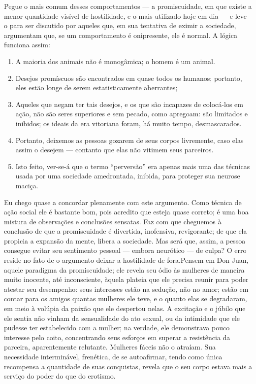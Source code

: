 Pegue o mais comum desses comportamentos --- a promiscuidade, em que
existe a menor quantidade visível de hostilidade, e o mais utilizado
hoje em dia --- e leve-o para ser discutido por aqueles que, em sua
tentativa de eximir a sociedade, argumentam que, se um comportamento é
onipresente, ele é normal. A lógica funciona assim:\idxanim{}


\begin{enumerate}
\item A maioria dos animais não é monogâmica; o homem é um animal.

\item Desejos promíscuos são encontrados em quase todos os humanos;
portanto, eles estão longe de serem estatisticamente aberrantes;

\item Aqueles que negam ter tais desejos, e os que são incapazes de
colocá-los em ação, não são seres superiores e sem pecado, como
apregoam: são limitados e inibidos; os ideais da era vitoriana foram,
há muito tempo, desmascarados.

\item Portanto, deixemos as pessoas gozarem de seus corpos livremente,
caso elas assim o desejem --- contanto que elas não vitimem seus
parceiros.

\item Isto feito, ver-se-á que o termo ``perversão'' era apenas mais uma
das técnicas usada por uma sociedade amedrontada, inibida, para
proteger sua neurose maciça.
\end{enumerate}

Eu chego quase a concordar plenamente com este argumento. Como
técnica de ação social ele é bastante bom, pois acredito que esteja
quase correto; é uma boa mistura de observações e conclusões sensatas.
Faz com que cheguemos à conclusão de que a promiscuidade\idxpromishost{} é divertida,
inofensiva, revigorante; de que ela propicia a expansão da mente,
libera a sociedade. Mas será que, assim, a pessoa consegue evitar seu
sentimento pessoal --- embora neurótico --- de culpa? O erro reside no fato
de o argumento deixar a hostilidade de fora.\idxhostsadi[|)] Pensem em Don Juan,\idxdonj{} aquele
paradigma da promiscuidade; ele revela seu ódio às mulheres de maneira
muito inocente, até inconsciente, àquela plateia que ele precisa reunir
para poder atestar seu desempenho: seus interesses estão na sedução,
não no amor; estão em contar para os amigos quantas mulheres ele teve,
e o quanto elas se degradaram, em meio à volúpia da paixão que ele
despertou nelas. A excitação e o júbilo que ele sentia não vinham da
sensualidade do ato sexual, ou da intimidade que ele pudesse ter
estabelecido com a mulher; na verdade, ele demonstrava pouco interesse
pelo coito, concentrando seus esforços em superar a resistência da
parceira, aparentemente relutante. Mulheres fáceis não o atraíam. Sua
necessidade interminável, frenética, de se autoafirmar, tendo como
única recompensa a quantidade de suas conquistas, revela que o seu
corpo estava mais a serviço do poder do que do erotismo.

